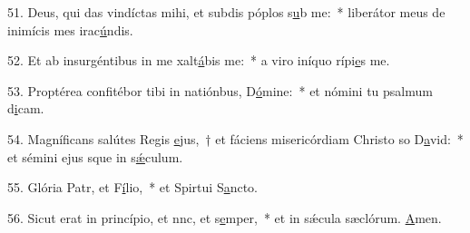 51. Deus, qui das vindíctas mihi, et subdis póplos s\uline{u}b me:~* liberátor meus de inimícis mes irac\uline{ú}ndis.\par 
52. Et ab insurgéntibus in me xalt\uline{á}bis me:~* a viro iníquo rípi\uline{e}s me.\par 
53. Proptérea confitébor tibi in natiónbus, D\uline{ó}mine:~* et nómini tu psalmum d\uline{i}cam.\par 
54. Magníficans salútes Regis \uline{e}jus,~† et fáciens misericórdiam Christo so D\uline{a}vid:~* et sémini ejus sque in s\uline{ǽ}culum.\par 
55. Glória Patr, et F\uline{í}lio,~* et Spirtui S\uline{a}ncto.\par 
56. Sicut erat in princípio, et nnc, et s\uline{e}mper,~* et in sǽcula sæclórum. \uline{A}men.\par 
